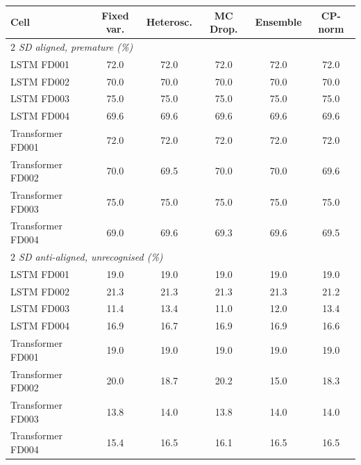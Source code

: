 \begin{tabular}{lccccc}\toprule
Cell & Fixed var. & Heterosc. & MC Drop. & Ensemble & CP-norm \\ \midrule
\multicolumn{6}{l}{\emph{$2$ SD aligned, premature (\%)}} \\
LSTM FD001 & 72.0 & 72.0 & 72.0 & 72.0 & 72.0 \\
LSTM FD002 & 70.0 & 70.0 & 70.0 & 70.0 & 70.0 \\
LSTM FD003 & 75.0 & 75.0 & 75.0 & 75.0 & 75.0 \\
LSTM FD004 & 69.6 & 69.6 & 69.6 & 69.6 & 69.6 \\
Transformer FD001 & 72.0 & 72.0 & 72.0 & 72.0 & 72.0 \\
Transformer FD002 & 70.0 & 69.5 & 70.0 & 70.0 & 69.6 \\
Transformer FD003 & 75.0 & 75.0 & 75.0 & 75.0 & 75.0 \\
Transformer FD004 & 69.0 & 69.6 & 69.3 & 69.6 & 69.5 \\
\multicolumn{6}{l}{\emph{$2$ SD anti-aligned, unrecognised (\%)}} \\
LSTM FD001 & 19.0 & 19.0 & 19.0 & 19.0 & 19.0 \\
LSTM FD002 & 21.3 & 21.3 & 21.3 & 21.3 & 21.2 \\
LSTM FD003 & 11.4 & 13.4 & 11.0 & 12.0 & 13.4 \\
LSTM FD004 & 16.9 & 16.7 & 16.9 & 16.9 & 16.6 \\
Transformer FD001 & 19.0 & 19.0 & 19.0 & 19.0 & 19.0 \\
Transformer FD002 & 20.0 & 18.7 & 20.2 & 15.0 & 18.3 \\
Transformer FD003 & 13.8 & 14.0 & 13.8 & 14.0 & 14.0 \\
Transformer FD004 & 15.4 & 16.5 & 16.1 & 16.5 & 16.5 \\
\bottomrule\end{tabular}
